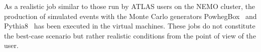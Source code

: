 As a realistic job similar to those run by ATLAS users on the NEMO
cluster, the production of simulated events with the Monte Carlo
generators PowhegBox~\cite{PowhegBox} and Pythia8~\cite{Pythia8} has been executed in the virtual
machines.
These jobs do not constitute the best-case scenario but rather
realistic conditions from the point of view of the user.
